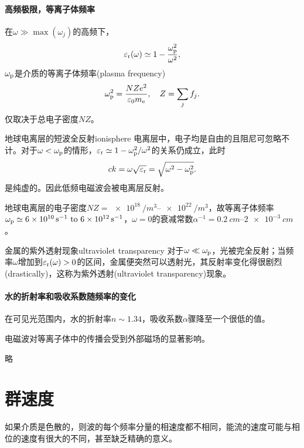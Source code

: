 \paragraph{高频极限，等离子体频率}

在$\omega\gg\max(\omega_j)$的高频下，
\[
    \varepsilon_\text r(\omega)\simeq 1-\frac{\omega_\text p^2}{\omega^2},
\]
$\omega_\text p$是介质的等离子体频率(plasma frequency)
\begin{equation}
    \omega_\text p^2=\frac{NZe^2}{\varepsilon_0m_\mathrm e},\quad Z=\sum_jf_j.
\end{equation}
仅取决于总电子密度$NZ$。
\begin{example}{地球电离层的短波全反射}{ionisphere}
    电离层中，电子均是自由的且阻尼可忽略不计。对于$\omega<\omega_\text p$的情形，$\varepsilon_\text r\simeq 1-\omega_\text p^2/\omega^2$的关系仍成立，此时
    \[
        ck=\omega\sqrt{\varepsilon_\text r}=\sqrt{\omega^2-\omega_\text p^2}.
    \]
    是纯虚的。因此低频电磁波会被电离层反射。

    地球电离层的电子密度$NZ=\SIrange{e18}{e22}{/m^3}$，故等离子体频率$\omega_\text p\simeq\SIrange{6e10}{6e12}{s^{-1}}$，$\omega=0$的衰减常数$\alpha^{-1}=\SIrange{0.2}{2e-3}{cm}$。
\end{example}
\begin{example}{金属的紫外透射现象}{ultraviolet transparency}
    对于$\omega\ll\omega_\text p$，光被完全反射；当频率$\omega$增加到$\varepsilon_\text r(\omega)>0$的区间，金属便突然可以透射光，其反射率变化得很剧烈(drastically)，这称为紫外透射(ultraviolet transparency)现象。
\end{example}

\paragraph{水的折射率和吸收系数随频率的变化}

在可见光范围内，水的折射率$n\sim 1.34$，吸收系数$\alpha$骤降至一个很低的值。


电磁波对等离子体中的传播会受到外部磁场的显著影响。

略

\section{群速度}

如果介质是色散的，则波的每个频率分量的相速度都不相同，能流的速度可能与相位的速度有很大的不同，甚至缺乏精确的意义。


